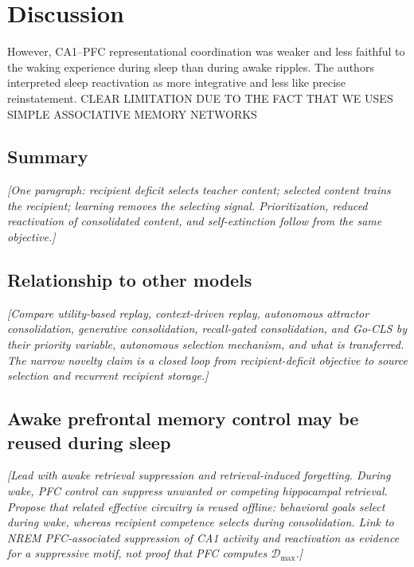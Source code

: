 \documentclass[10pt,letterpaper]{article}
\theoremstyle{plain}
\theoremstyle{remark}
\begin{document}
\section{Discussion}


However, CA1–PFC representational coordination was weaker and less faithful to the waking experience during sleep than during awake ripples. The authors interpreted sleep reactivation as more integrative and less like precise reinstatement. CLEAR LIMITATION DUE TO THE FACT THAT WE USES SIMPLE ASSOCIATIVE MEMORY NETWORKS

\subsection{Summary}
\textit{[One paragraph: recipient deficit selects teacher content; selected content trains the recipient; learning removes the selecting signal. Prioritization, reduced reactivation of consolidated content, and self-extinction follow from the same objective.]}

\subsection{Relationship to other models}
\textit{[Compare utility-based replay, context-driven replay, autonomous attractor consolidation, generative consolidation, recall-gated consolidation, and Go-CLS by their priority variable, autonomous selection mechanism, and what is transferred. The narrow novelty claim is a closed loop from recipient-deficit objective to source selection and recurrent recipient storage.]}

\subsection{Awake prefrontal memory control may be reused during sleep}
\textit{[Lead with awake retrieval suppression and retrieval-induced forgetting. During wake, PFC control can suppress unwanted or competing hippocampal retrieval. Propose that related effective circuitry is reused offline: behavioral goals select during wake, whereas recipient competence selects during consolidation. Link to NREM PFC-associated suppression of CA1 activity and reactivation as evidence for a suppressive motif, not proof that PFC computes $\mathcal D_{\max}$.]}
\end{document}
